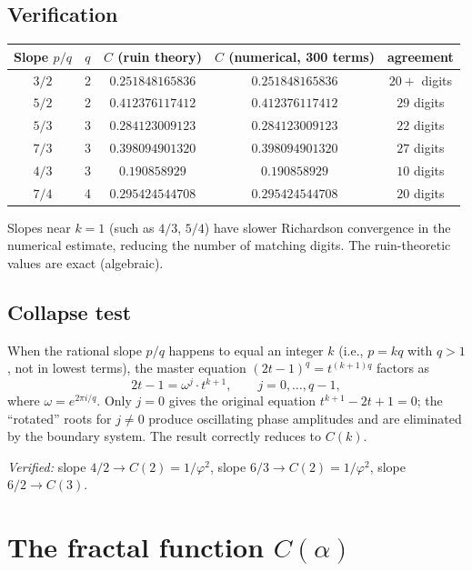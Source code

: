\documentclass[11pt]{article}
\theoremstyle{definition}
\theoremstyle{remark}
\begin{document}
\subsection{Verification}

\begin{center}
\begin{tabular}{ccccc}
\toprule
Slope $p/q$ & $q$ & $C$ (ruin theory) & $C$ (numerical, 300 terms)
  & agreement \\
\midrule
$3/2$ & 2 & $0.251848165836$ & $0.251848165836$ & $20+$ digits \\
$5/2$ & 2 & $0.412376117412$ & $0.412376117412$ & $29$ digits \\
$5/3$ & 3 & $0.284123009123$ & $0.284123009123$ & $22$ digits \\
$7/3$ & 3 & $0.398094901320$ & $0.398094901320$ & $27$ digits \\
$4/3$ & 3 & $0.190858929$ & $0.190858929$ & $10$ digits \\
$7/4$ & 4 & $0.295424544708$ & $0.295424544708$ & $20$ digits \\
\bottomrule
\end{tabular}
\end{center}

Slopes near $k = 1$ (such as $4/3$, $5/4$) have slower Richardson
convergence in the numerical estimate, reducing the number of
matching digits.
The ruin-theoretic values are exact (algebraic).

\subsection{Collapse test}

When the rational slope $p/q$ happens to equal an integer $k$ (i.e.,
$p = kq$ with $q > 1$, not in lowest terms), the master equation
$(2t-1)^q = t^{(k+1)q}$ factors as
\[
2t - 1 = \omega^j \cdot t^{k+1},
\qquad j = 0, \ldots, q - 1,
\]
where $\omega = e^{2\pi i / q}$.
Only $j = 0$ gives the original equation $t^{k+1} - 2t + 1 = 0$;
the ``rotated'' roots for $j \neq 0$ produce oscillating phase
amplitudes and are eliminated by the boundary system.
The result correctly reduces to $C(k)$.

\emph{Verified:} slope $4/2 \to C(2) = 1/\varphi^2$,
slope $6/3 \to C(2) = 1/\varphi^2$, slope $6/2 \to C(3)$.

\section{The fractal function \texorpdfstring{$C(\alpha)$}{C(α)}}
  \label{sec:fractal}
\end{document}
